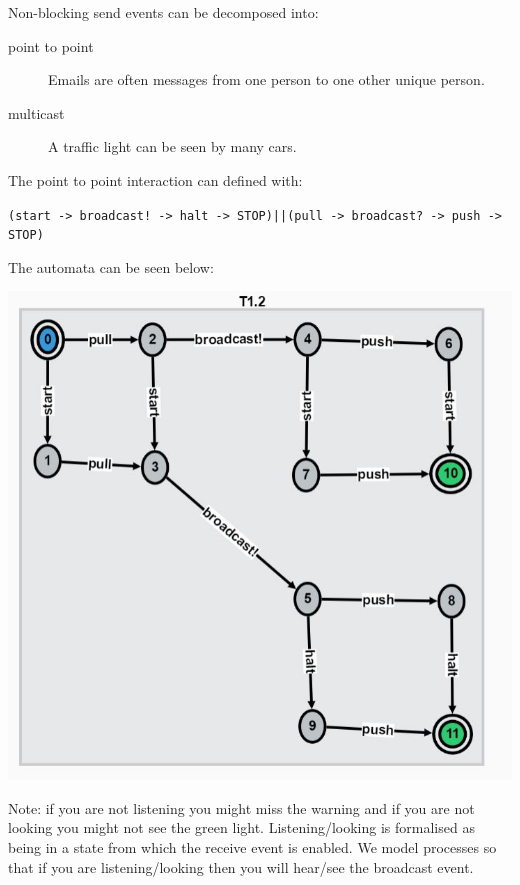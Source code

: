 \documentclass[]{article}
\begin{document}
Non-blocking send events can be decomposed into:
\begin{description}
\item[point to point] Emails are often messages from one person to one other  unique person.
\item[multicast] A traffic light can be seen by many cars.
\end{description}

The point to point interaction can  defined with: 



\begin{center}\verb$(start -> broadcast! -> halt -> STOP)||(pull -> broadcast? -> push -> STOP)$
\end{center}
The automata  can be seen  below:
\begin{center}	
	\includegraphics[scale=0.5]{bcast.jpg} \end{center}
	
	
	
Note: if you are not listening you might miss the warning and if you are not looking you might not see the green light. Listening/looking is formalised as being in a state from which the receive event is enabled. We model processes so that if you are listening/looking then you will hear/see the broadcast event.
\end{document}
